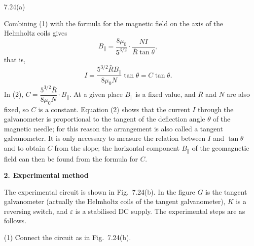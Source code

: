 \begin{figbox}{7.24(a)}
\end{figbox}

Combining (1) with the formula for the magnetic field on the axis of the Helmholtz coils gives
\[
B_\parallel=\frac{8\mu_0}{5^{3/2}}\cdot\frac{NI}{\bar{R}\tan\theta},
\]
that is,
\begin{equation}
I=\frac{5^{3/2}\bar{R}B_\parallel}{8\mu_0N}\tan\theta=C\tan\theta . \tag{2}
\end{equation}
In (2), $C=\dfrac{5^{3/2}\bar{R}}{8\mu_0N}\cdot B_\parallel$. At a given place $B_\parallel$ is a fixed value, and $\bar{R}$ and $N$ are also fixed, so $C$ is a constant. Equation (2) shows that the current $I$ through the galvanometer is proportional to the tangent of the deflection angle $\theta$ of the magnetic needle; for this reason the arrangement is also called a tangent galvanometer. It is only necessary to measure the relation between $I$ and $\tan\theta$ and to obtain $C$ from the slope; the horizontal component $B_\parallel$ of the geomagnetic field can then be found from the formula for $C$.

\textbf{2. Experimental method}

The experimental circuit is shown in Fig.~7.24(b). In the figure $G$ is the tangent galvanometer (actually the Helmholtz coils of the tangent galvanometer), $K$ is a reversing switch, and $\varepsilon$ is a stabilised DC supply. The experimental steps are as follows.

(1) Connect the circuit as in Fig.~7.24(b).

